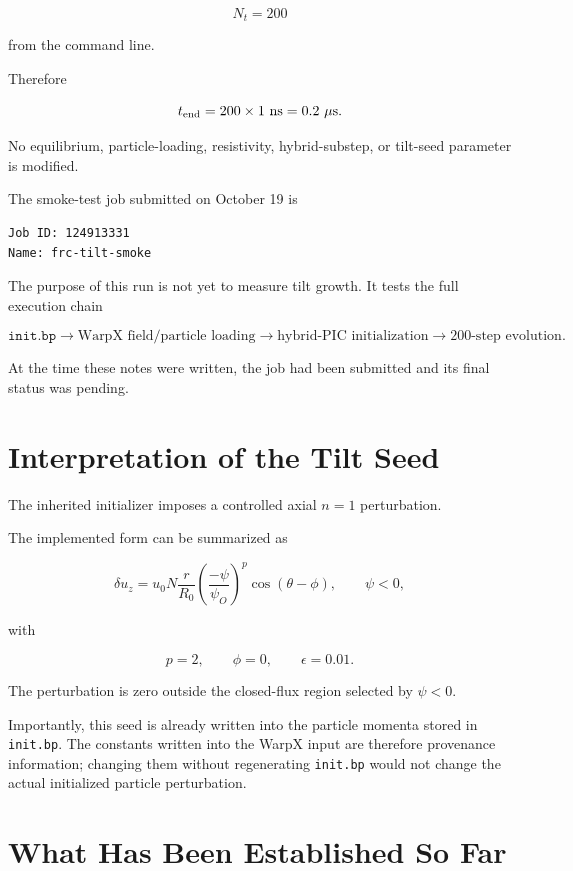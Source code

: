 \documentclass[11pt,a4paper]{article}
\begin{document}
\[
\boxed{
N_t=200
}
\]

from the command line.

Therefore

\[
t_{\rm end}
=
200\times1~\mathrm{ns}
=
0.2~\mu\mathrm{s}.
\]

No equilibrium, particle-loading, resistivity, hybrid-substep, or tilt-seed
parameter is modified.

The smoke-test job submitted on October 19 is

\begin{lstlisting}
Job ID: 124913331
Name: frc-tilt-smoke
\end{lstlisting}

The purpose of this run is not yet to measure tilt growth. It tests the full
execution chain

\[
\boxed{
\texttt{init.bp}
\rightarrow
\text{WarpX field/particle loading}
\rightarrow
\text{hybrid-PIC initialization}
\rightarrow
200\text{-step evolution}.
}
\]

At the time these notes were written, the job had been submitted and its final
status was pending.

\section{Interpretation of the Tilt Seed}

The inherited initializer imposes a controlled axial \(n=1\) perturbation.

The implemented form can be summarized as

\[
\delta u_z
=
u_0
N
\frac{r}{R_0}
\left(
\frac{-\psi}{\psi_O}
\right)^p
\cos(\theta-\phi),
\qquad
\psi<0,
\]

with

\[
p=2,
\qquad
\phi=0,
\qquad
\epsilon=0.01.
\]

The perturbation is zero outside the closed-flux region selected by
\(\psi<0\).

Importantly, this seed is already written into the particle momenta stored in
\texttt{init.bp}. The constants written into the WarpX input are therefore
provenance information; changing them without regenerating
\texttt{init.bp} would not change the actual initialized particle
perturbation.

\section{What Has Been Established So Far}
\end{document}

